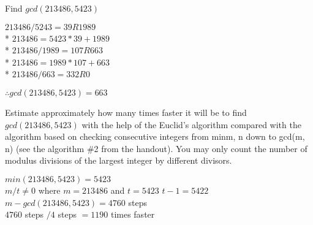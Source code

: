 \documentclass[12pt,largemargins]{homework}
\date{Septemeber 6, 2018}
\begin{document}
\maketitle


\question
  \begin{alphaparts}

  \item
    Find $gcd(213486, 5423)$

    \begin{linenumbers}
      $213486 / 5243 = 39 R 1989$ \\*
      $213486 = 5423 * 39 + 1989$ \\*
      $213486 / 1989 = 107 R 663$ \\*
      $213486 = 1989 * 107 + 663$ \\*
      $213486 / 663 = 332 R 0 $

    \end{linenumbers}

    $\therefore gcd(213486,5423) = 663 $ 


  \item
    Estimate approximately how many times faster it will be to find
    $gcd(213486, 5423)$ with the help of the Euclid’s algorithm compared with the algorithm based on checking consecutive integers from min{m, n} down to gcd(m, n) (see the algorithm \#2 from the handout). You may only count the number of modulus divisions of the largest integer by different divisors.


    \begin{linenumbers}
      $min(213486,5423) = 5423$ \\
      $m/t \neq 0 $ where $m=213486$ and $ t=5423 $
      $t-1 = 5422 $ \\
      $m-gcd(213486, 5423) = 4760$ steps \\
      $4760$ steps $/4$ steps $=1190$ times faster 
    \end{linenumbers}

\end{alphaparts}
\end{document}
